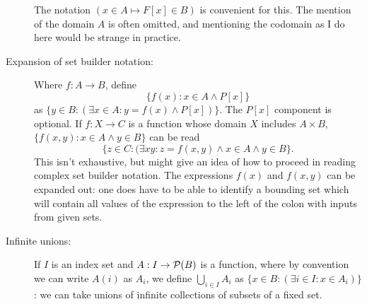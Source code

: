 \documentclass[12pt]{article}
\begin{document}
\begin{description}
The notation $(x \in A \mapsto F[x] \in B)$ is convenient for this.  The mention of the domain $A$ is often omitted, and mentioning the codomain as I do here would be strange in practice.

\item[Expansion of set builder notation:]  Where $f:A \rightarrow B$, define $$\{f(x):x \in A\wedge P[x]\}$$ as
$\{y \in B:(\exists x\in A:y=f(x) \wedge P[x])\}$.  The $P[x]$ component is optional.  If $f:X \rightarrow C$
is a function whose domain $X$ includes $A \times B$, $\{f(x,y):x \in A \wedge y \in B\}$ can be read
$$\{z \in C:(\exists xy:z=f(x,y) \wedge x \in A \wedge y \in B\}.$$ This isn't exhaustive, but might give an idea of how to proceed in reading complex set builder notation.  The expressions $f(x)$ and $f(x,y)$ can be expanded out:  one does have to be able to identify a bounding set which will contain all values of the expression to the left of the colon with inputs from given sets.

\item[Infinite unions:]  If $I$ is an index set and $A:I\rightarrow {\cal P}(B)$ is a function, where by convention we can write $A(i)$ as $A_i$, we define $\bigcup_{i \in I}A_i$ as $\{x \in B:(\exists i \in I:x \in A_i)\}$:  we can take unions of infinite collections of subsets of a fixed set.

\end{description}
\end{document}
